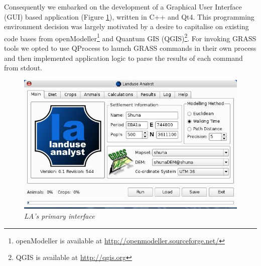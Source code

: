   Consequently we embarked on the development of a Graphical User Interface (GUI)
  based application (Figure \ref{fig:la544}), written in C++ and Qt4. This
  programming environment decision was largely motivated by a desire to
  capitalise on existing code bases from openModeller\footnote{openModeller is
  available at \url{http://openmodeller.sourceforge.net/}} and Quantum GIS
  (QGIS)\footnote{QGIS is available at \url{http://qgis.org}}.  For invoking
  GRASS tools we opted to use QProcess to launch GRASS commands in their own
  process and then implemented application logic to parse the results of each
  command from stdout.
\begin{figure}[htbp] %
  \includegraphics[scale=0.36]{./images/LanduseAnalyst544.jpg}
  \caption{\label{fig:la544}\textit{LA's primary interface}}
\end{figure}
